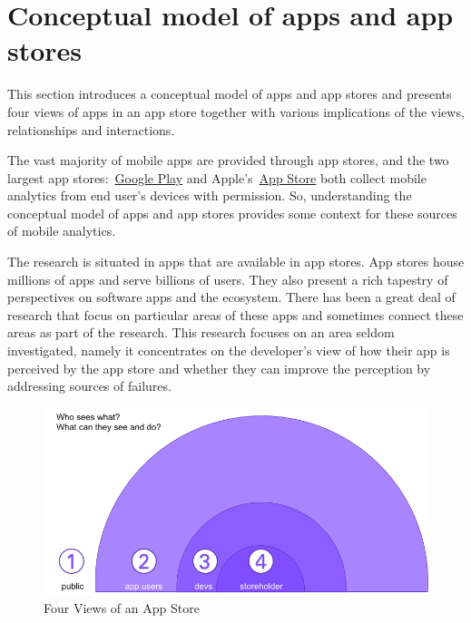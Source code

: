 \section{Conceptual model of apps and app stores}
This section introduces a conceptual model of apps and app stores and presents four views of apps in an app store together with various implications of the views, relationships and interactions. 

The vast majority of mobile apps are provided through app stores, and the two largest app stores:~\href{https://play.google.com/store/apps}{Google Play} and Apple's~\href{https://www.apple.com/app-store/}{App Store} both collect mobile analytics from end user's devices with permission. So, understanding the conceptual model of apps and app stores provides some context for these sources of mobile analytics. 

The research is situated in apps that are available in app stores. App stores house millions of apps and serve billions of users. They also present a rich tapestry of perspectives on software apps and the ecosystem. There has been a great deal of research that focus on particular areas of these apps and sometimes connect these areas as part of the research. This research focuses on an area seldom investigated, namely it concentrates on the developer's view of how their app is perceived by the app store and whether they can improve the perception by addressing sources of failures.


\begin{figure}[ht]
    \centering
    \includegraphics[width=12cm]{images/who-sees-what.png}
    \caption{Four Views of an App Store}
    \label{fig:4-views-of-apps-in-app-store}
\end{figure}

